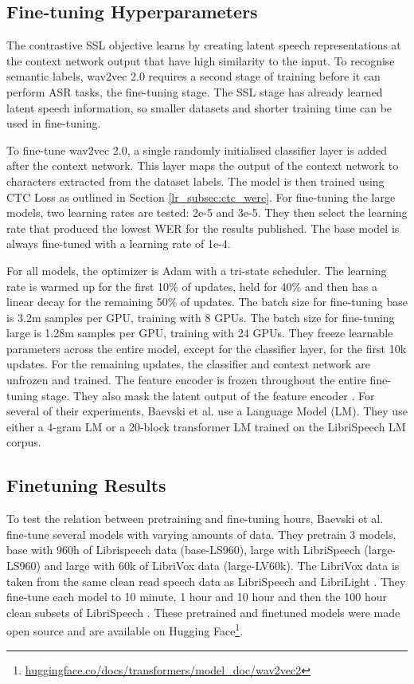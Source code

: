 \subsection{Fine-tuning Hyperparameters}
The contrastive SSL objective learns by creating latent speech representations at the context network output that have high similarity to the input. To recognise semantic labels, wav2vec 2.0 requires a second stage of training before it can perform ASR tasks, the fine-tuning stage. The SSL stage has already learned latent speech information, so smaller datasets and shorter training time can be used in fine-tuning.

To fine-tune wav2vec 2.0, a single randomly initialised classifier layer is added after the context network. This layer maps the output of the context network to characters extracted from the dataset labels. The model is then trained using CTC Loss \cite{graves2006connectionist} as outlined in Section \ref{lr_subsec:ctc_were}. For fine-tuning the large models, two learning rates are tested: 2e-5 and 3e-5. They then select the learning rate that produced the lowest WER for the results published. The base model is always fine-tuned with a learning rate of 1e-4. 

For all models, the optimizer is Adam with a tri-state scheduler. The learning rate is warmed up for the first 10\% of updates, held for 40\% and then has a linear decay for the remaining 50\% of updates. The batch size for fine-tuning base is 3.2m samples per GPU, training with 8 GPUs. The batch size for fine-tuning large is 1.28m samples per GPU, training with 24 GPUs. They freeze learnable parameters across the entire model, except for the classifier layer, for the first 10k updates. For the remaining updates, the classifier and context network are unfrozen and trained. The feature encoder is frozen throughout the entire fine-tuning stage. They also mask the latent output of the feature encoder \cite{park2019specaugment}. For several of their experiments, Baevski et al. \cite{wav2vec} use a Language Model (LM). They use either a 4-gram LM or a 20-block transformer LM trained on the LibriSpeech LM corpus.

\subsection{Finetuning Results}
To test the relation between pretraining and fine-tuning hours, Baevski et al. \cite{wav2vec} fine-tune several models with varying amounts of data. They pretrain 3 models, base with 960h of Librispeech data (base-LS960), large with LibriSpeech (large-LS960) and large with 60k of LibriVox data (large-LV60k). The LibriVox data is taken from the same clean read speech data as LibriSpeech and LibriLight \cite{librispeech, librilight}. They fine-tune each model to 10 minute, 1 hour and 10 hour and then the 100 hour clean subsets of LibriSpeech \cite{librispeech}. These pretrained and finetuned models were made open source and are available on Hugging Face\footnote{\hyperlink{https://huggingface.co/docs/transformers/model_doc/wav2vec2}{huggingface.co/docs/transformers/model\_doc/wav2vec2}}.

